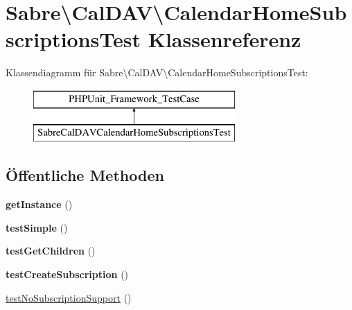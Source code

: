 \hypertarget{class_sabre_1_1_cal_d_a_v_1_1_calendar_home_subscriptions_test}{}\section{Sabre\textbackslash{}Cal\+D\+AV\textbackslash{}Calendar\+Home\+Subscriptions\+Test Klassenreferenz}
\label{class_sabre_1_1_cal_d_a_v_1_1_calendar_home_subscriptions_test}
Klassendiagramm für Sabre\textbackslash{}Cal\+D\+AV\textbackslash{}Calendar\+Home\+Subscriptions\+Test\+:\begin{figure}[H]
\begin{center}
\leavevmode
\includegraphics[height=2.000000cm]{class_sabre_1_1_cal_d_a_v_1_1_calendar_home_subscriptions_test}
\end{center}
\end{figure}
\subsection*{Öffentliche Methoden}
\begin{DoxyCompactItemize}
\item 
\mbox{\label{class_sabre_1_1_cal_d_a_v_1_1_calendar_home_subscriptions_test_a7ee7c0ca905ed19d05def270aee02462}} 
{\bfseries get\+Instance} ()
\item 
\mbox{\label{class_sabre_1_1_cal_d_a_v_1_1_calendar_home_subscriptions_test_a16ae6b03cd08f8face5d89e43302d6ab}} 
{\bfseries test\+Simple} ()
\item 
\mbox{\label{class_sabre_1_1_cal_d_a_v_1_1_calendar_home_subscriptions_test_ab5f5f55918bda74af2460b0a023231b5}} 
{\bfseries test\+Get\+Children} ()
\item 
\mbox{\label{class_sabre_1_1_cal_d_a_v_1_1_calendar_home_subscriptions_test_a1070fe4e527db4b0fc8e315c84a05f91}} 
{\bfseries test\+Create\+Subscription} ()
\item 
\mbox{\hyperlink{class_sabre_1_1_cal_d_a_v_1_1_calendar_home_subscriptions_test_a4f237ebb1bf20982c9d9cdf139f3bfad}{test\+No\+Subscription\+Support}} ()
\end{DoxyCompactItemize}

